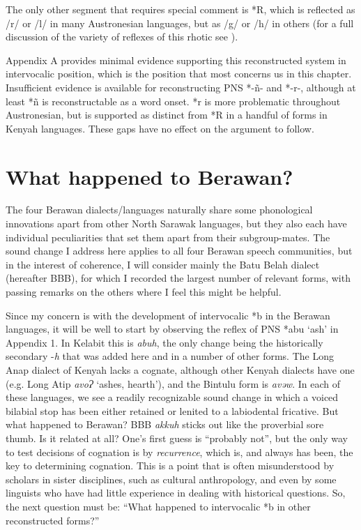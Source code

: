 \documentclass[output=paper]{langscibook}
\begin{document}
The only other segment that requires special comment is *R, which is reflected as /r/ or /l/ in many Austronesian languages, but as /g/ or /h/ in others (for a full discussion of the variety of reflexes of this rhotic see \citealt[595--596]{Blust2013}).

Appendix A provides minimal evidence supporting this reconstructed system in intervocalic position, which is the position that most concerns us in this chapter. Insufficient evidence is available for reconstructing PNS *-ñ- and *-r-, although at least *ñ is reconstructable as a word onset. *r is more problematic throughout Austronesian, but is supported as distinct from *R in a handful of forms in Kenyah languages. These gaps have no effect on the argument to follow.

\section{What happened to Berawan?}\label{sec:What-happened-Berewan}
  The four Berawan dialects/languages naturally share some phonological innovations apart from other North Sarawak languages, but they also each have individual peculiarities that set them apart from their subgroup-mates. The sound change I address here applies to all four Berawan speech communities, but in the interest of coherence, I will consider mainly the Batu Belah dialect (hereafter BBB), for which I recorded the largest number of relevant forms, with passing remarks on the others where I feel this might be helpful.

Since my concern is with the development of intervocalic *b in the Berawan languages, it will be well to start by observing the reflex of PNS *abu ‘ash’ in Appendix 1. In Kelabit this is \textit{abuh}, the only change being the historically secondary -\textit{h} that was added here and in a number of other forms. The Long Anap dialect of Kenyah lacks a cognate, although other Kenyah dialects have one (e.g. Long Atip \textit{avoɁ} ‘ashes, hearth’), and the Bintulu form is \textit{avəw}. In each of these languages, we see a readily recognizable sound change in which a voiced bilabial stop has been either retained or lenited to a labiodental fricative. But what happened to Berawan? BBB \textit{akkuh} sticks out like the proverbial sore thumb. Is it related at all? One’s first guess is “probably not”, but the only way to test decisions of cognation is by \textit{recurrence}, which is, and always has been, the key to determining cognation. This is a point that is often misunderstood by scholars in sister disciplines, such as cultural anthropology, and even by some linguists who have had little experience in dealing with historical questions. So, the next question must be: “What happened to intervocalic *b in other reconstructed forms?”
\end{document}
